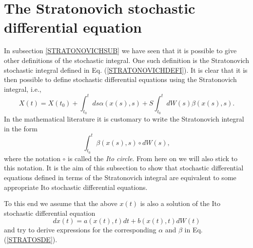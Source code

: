 \section{The Stratonovich stochastic differential equation}
In subsection \ref{STRATONOVICHSUB} we have seen that it is 
possible to give other definitions of the stochastic integral.
One such definition is the Stratonovich stochastic integral defined 
in Eq. (\ref{STRATONOVICHDEFI}). It is clear that it is then possible 
to define stochastic differential equations using the 
Stratonovich integral, i.e.,
\begin{equation}
\label{STRATOSDE}
X(t) = X(t_0) + \int_{t_0}^t ds \alpha(x(s),s) +
      S \int_{t_0}^t dW(s) \beta(x(s),s).
\end{equation}
In the mathematical literature it is customary to write
the Stratonovich integral in the form
\begin{equation*}
\int_{t_0}^t  \beta(x(s),s) \circ dW(s),
\end{equation*}
where the notation $\circ$ is called the {\em Ito circle}. From
here on we will also stick to this notation.
It is the aim of this subsection to show that stochastic 
differential equations defined in terms of the Stratonovich 
integral are equivalent to some appropriate Ito stochastic 
differential equations.

To this end we assume that the above $x(t)$ is also a solution of the Ito 
stochastic differential equation
\begin{equation}
\label{ITOSDEINS}
dx(t) = a(x(t),t) dt + b(x(t),t) dW(t)
\end{equation}
and try to derive expressions for the corresponding $\alpha$ and $\beta$
in Eq. (\ref{STRATOSDE}).

